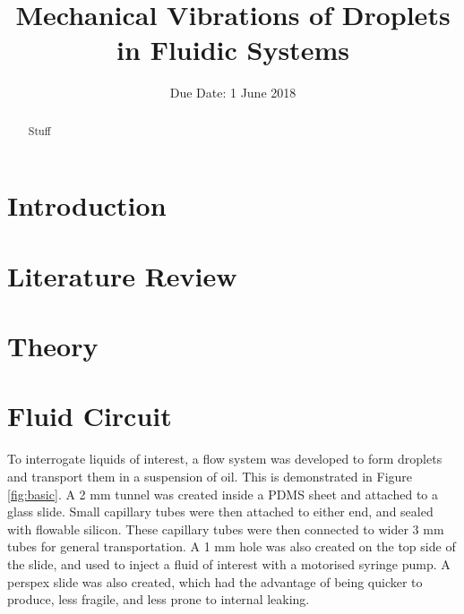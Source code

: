 \documentclass{physics_article_B}
\title{Mechanical Vibrations of Droplets in Fluidic Systems}
\date{Due Date: 1 June 2018}
\begin{document}
	
\setcounter{page}{0}
%

\begin{abstract}
	\large{Stuff
}
\end{abstract}
	

\tableofcontents

\setcounter{page}{1}
	
\newpage
{} 
\setcounter{page}{1}

\newpage

\section{Introduction\label{sect:intro}}

\section{Literature Review\label{sect:litrev}}

\section{Theory\label{sect:theory}}

\section{Fluid Circuit\label{sect_loop}}

To interrogate liquids of interest, a flow system was developed to form droplets and transport them in a suspension of oil. This is demonstrated in Figure \ref{fig:basic}. A 2 mm tunnel was created inside a PDMS sheet and attached to a glass slide. Small capillary tubes were then attached to either end, and sealed with flowable silicon. These capillary tubes were then connected to wider 3 mm tubes for general transportation. A 1 mm hole was also created on the top side of the slide, and used to inject a fluid of interest with a motorised syringe pump. A perspex slide was also created, which had the advantage of being quicker to produce, less fragile, and less prone to internal leaking.\\
\end{document}
